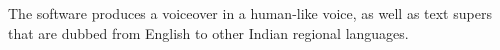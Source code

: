 \documentclass[preview]{standalone}
\begin{document}
\begin{flushleft}
\fontsize{20}{0}\selectfont The software produces a voiceover in a human-like voice, as well as text supers that are dubbed from English to other Indian regional languages.
\end{flushleft}
\end{document}
